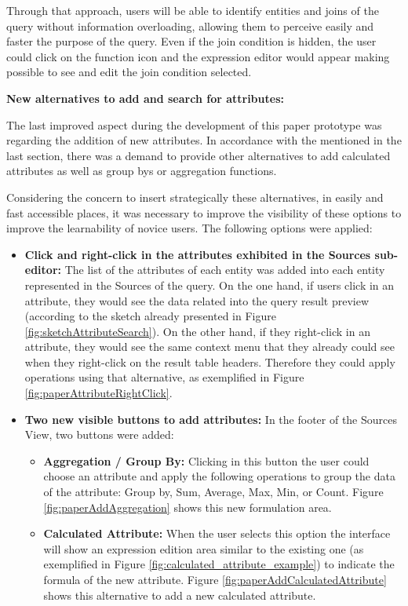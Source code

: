 Through that approach, users will be able to identify entities and joins of the query without information overloading, allowing them to perceive easily and faster the purpose of the query. Even if the join condition is hidden, the user could click on the function icon and the expression editor would appear making possible to see and edit the join condition selected.

\medskip

\textbf{New alternatives to add and search for attributes:}

\medskip

The last improved aspect during the development of this paper prototype was regarding the addition of new attributes. In accordance with the mentioned in the last section, there was a demand to provide other alternatives to add calculated attributes as well as group bys or aggregation functions.

Considering the concern to insert strategically these alternatives, in easily and fast accessible places, it was necessary to improve the visibility of these options to improve the learnability of novice users. The following options were applied:

\begin{itemize}
  \item \textbf{Click and right-click in the attributes exhibited in the Sources sub-editor: }The list of the attributes of each entity was added into each entity represented in the Sources of the query. On the one hand, if users click in an attribute, they would see the data related into the query result preview (according to the sketch already presented in Figure \ref{fig:sketchAttributeSearch}). On the other hand, if they right-click in an attribute, they would see the same context menu that they already could see when they right-click on the result table headers. Therefore they could apply operations using that alternative, as exemplified in Figure \ref{fig:paperAttributeRightClick}.
  \item \textbf{Two new visible buttons to add attributes: }In the footer of the Sources View, two buttons were added:
    \begin{itemize}
      \item \textbf{Aggregation / Group By: }Clicking in this button the user could choose an attribute and apply the following operations to group the data of the attribute: Group by, Sum, Average, Max, Min, or Count. Figure \ref{fig:paperAddAggregation} shows this new formulation area.
      \item \textbf{Calculated Attribute: }When the user selects this option the interface will show an expression edition area similar to the existing one (as exemplified in Figure \ref{fig:calculated_attribute_example}) to indicate the formula of the new attribute. Figure \ref{fig:paperAddCalculatedAttribute} shows this alternative to add a new calculated attribute.
    \end{itemize}
\end{itemize}


